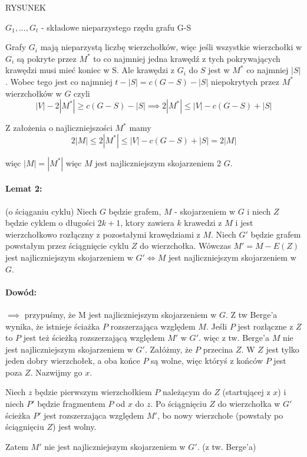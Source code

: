 RYSUNEK

$G_1,...,G_t$ - składowe nieparzystego rzędu grafu G-S

Grafy $G_i$ mają nieparzystą liczbę wierzchołków, więc jeśli wszystkie wierzchołki w $G_i$ są pokryte przez $M^*$ to co najmniej jedna krawędź z tych pokrywających krawędzi musi mieć koniec w S. Ale krawędzi z $G_i$ do $S$ jest w $M^*$ co najmniej $|S|$. Wobec tego jest co najmniej $t-|S| = c(G-S) - |S|$ niepokrytych przez $M^*$ wierzchołków w $G$ czyli 
$$|V|-2|M^*| \geq c(G-S) - |S| \implies 2 |M^*| \leq |V| - c(G-S) + |S|$$

Z założenia o najliczniejszości $M^*$ mamy
$$ 2|M| \leq 2|M^*| \leq |V| - c(G-S) + |S| = 2|M|$$

więc $|M| = |M^*|$ więc $M$ jest najliczniejszym skojarzeniem 2 $G$.

\paragraph{Lemat 2:}{(o ściąganiu cyklu)}
Niech $G$ będzie grafem, $M$ - skojarzeniem w $G$ i niech $Z$ będzie cyklem o długości $2k+1$, ktory zawiera $k$ krawedzi z $M$ i jest wierzchołkowo rozłączny z pozostałymi krawędziami z $M$.
Niech $G'$ będzie grafem powstałym przez ściągnięcie cyklu $Z$ do wierzchołka. Wówczas $M' = M - E(Z)$ jest najliczniejszym skojarzeniem w $G' \iff M$ jest najliczniejszym skojarzeniem w $G$.

\paragraph{Dowód:}
$\implies$ przypuśmy, że M jest najliczniejszym skojarzeniem w $G$. Z tw Berge'a wynika, że istnieje ściażka $P$ rozszerzająca względem $M$. Jeśli $P$ jest rozłączne z $Z$ to $P$ jest też ścieżką rozszerzającą względem $M'$ w $G'$.
więc z tw. Berge'a $M$ nie jest najliczniejszym skojarzeniem w $G'$. Załóżmy, że $P$ przecina $Z$. W $Z$ jest tylko jeden dobry wierzchołek, a oba końce $P$ są wolne, więc któryś z końców $P$ jest poza $Z$. Nazwijmy go $x$.

Niech $z$ będzie pierwszym wierzchołkiem $P$ należącym do $Z$ (startującej z $x$) i niech $P'$ będzie fragmentem $P$ od $x$ do $z$.
Po ściągnięciu $Z$ do wierzchołka w $G'$ ścieżka $P'$ jest rozszerzająca względem $M'$, bo nowy wierzchołe (powstały po ściągnięciu $Z$) jest wolny.

Zatem $M'$ nie jest najliczniejszym skojarzeniem w $G'$. (z tw. Berge'a)

